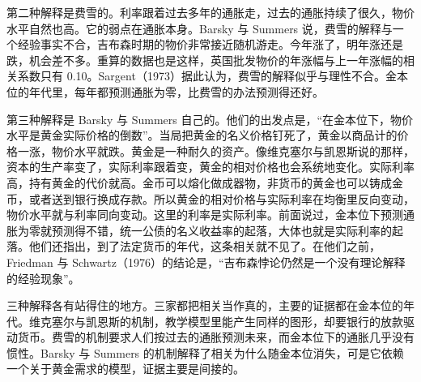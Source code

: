 第二种解释是费雪的。利率跟着过去多年的通胀走，过去的通胀持续了很久，物价水平自然也高。它的弱点在通胀本身。Barsky 与 Summers 说，费雪的解释与一个经验事实不合，吉布森时期的物价非常接近随机游走\cite{barsky1985}。今年涨了，明年涨还是跌，机会差不多。重算的数据也是这样，英国批发物价的年涨幅与上一年涨幅的相关系数只有 0.10\cite{boe2017}。Sargent（1973）据此认为，费雪的解释似乎与理性不合\cite{barsky1985}。金本位的年代里，每年都预测通胀为零，比费雪的办法预测得还好\cite{barsky1985}。

第三种解释是 Barsky 与 Summers 自己的。他们的出发点是，“在金本位下，物价水平是黄金实际价格的倒数”\cite{barsky1985}。当局把黄金的名义价格钉死了，黄金以商品计的价格一涨，物价水平就跌\cite{barsky1985}。黄金是一种耐久的资产。像维克塞尔与凯恩斯说的那样，资本的生产率变了，实际利率跟着变，黄金的相对价格也会系统地变化\cite{barsky1985}。实际利率高，持有黄金的代价就高。金币可以熔化做成器物，非货币的黄金也可以铸成金币，或者送到银行换成存款\cite{barsky1985}。所以黄金的相对价格与实际利率在均衡里反向变动，物价水平就与利率同向变动\cite{barsky1985}。这里的利率是实际利率。前面说过，金本位下预测通胀为零就预测得不错，统一公债的名义收益率的起落，大体也就是实际利率的起落。他们还指出，到了法定货币的年代，这条相关就不见了\cite{barsky1985}。在他们之前，Friedman 与 Schwartz（1976）的结论是，“吉布森悖论仍然是一个没有理论解释的经验现象”\cite{barsky1985}。

三种解释各有站得住的地方。三家都把相关当作真的，主要的证据都在金本位的年代。维克塞尔与凯恩斯的机制，教学模型里能产生同样的图形，却要银行的放款驱动货币。费雪的机制要求人们按过去的通胀预测未来，而金本位下的通胀几乎没有惯性。Barsky 与 Summers 的机制解释了相关为什么随金本位消失，可是它依赖一个关于黄金需求的模型，证据主要是间接的。

